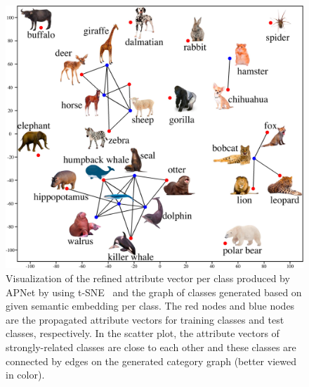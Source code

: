 \documentclass[letterpaper]{article} %
\begin{document}
\begin{figure}[ht!]
\begin{center}
\includegraphics[width=\columnwidth]{TSNE-VIS.pdf}
\end{center}
\caption{Visualization of the refined attribute vector per class produced by APNet by using t-SNE~\cite{maaten2008visualizing} and the graph of classes generated based on given semantic embedding per class. The red nodes and blue nodes are the propagated attribute vectors for training classes and test classes, respectively. In the scatter plot, the attribute vectors of strongly-related classes are close to each other and these classes are connected by edges on the generated category graph (better viewed in color).}
\label{fig:TSNE-Results}
\end{figure}
\end{document}

